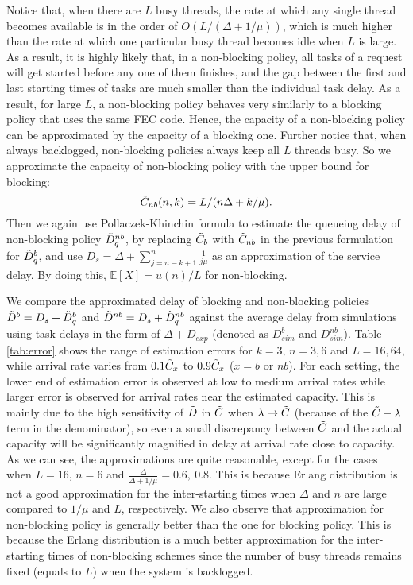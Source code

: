 \documentclass[journal]{IEEEtran}
\newcommand{\Expect}{\mathbb{E}}
\begin{document}
Notice that, when there are $L$ busy threads, the rate at which any single thread becomes available is in the order of $O(L/(\Delta + 1/\mu))$, which is much higher than the rate at which one particular busy thread becomes idle when $L$ is large. As a result, it is highly likely that, in a non-blocking policy, all tasks of a request will get started before any one of them finishes, and the gap between the first and last starting times of tasks are much smaller than the individual task delay. As a result, for large $L$,  a non-blocking policy behaves very similarly to a blocking policy that uses the same FEC code. Hence, the capacity of a non-blocking policy can be approximated by the capacity of a blocking one. Further notice that, when always backlogged, non-blocking policies always keep all $L$ threads busy. So we approximate the capacity of non-blocking policy with the upper bound for blocking:
\begin{equation}
\tilde{C}_{nb}(n,k) = L/(n\Delta + k/\mu).
\label{eq:nonblocking:cap}
\end{equation}
Then we again use Pollaczek-Khinchin formula to estimate the queueing delay of non-blocking policy $\tilde{D}_q^{nb}$, by replacing $\tilde{C}_b$ with $\tilde{C}_{nb}$ in the previous formulation for $\tilde{D}_q^b$, and use $D_s=\Delta +\sum_{j=n-k+1}^n \frac{1}{j\mu}$ as an approximation of the service delay. By doing this, $\Expect[X] = u(n)/L$ for non-blocking. 

We compare the approximated delay of blocking and non-blocking policies $\tilde{D}^b = D_s + \tilde{D}^b_q$ and $\tilde{D}^{nb} = D_s + \tilde{D}^{nb}_q$ against the average delay from simulations using  task delays in the form of $\Delta+D_{exp}$ (denoted as $D_{sim}^b$ and $D_{sim}^{nb}$). 
Table \ref{tab:error} shows the range of estimation errors for $k=3$, $n=3,6$ and $L=16,64$, while arrival rate varies from $0.1\tilde{C}_x$ to $0.9\tilde{C}_x$ ($x=b$ or $nb$). 
For each setting, the lower end of estimation error is observed at low to medium arrival rates while larger error is observed for arrival rates near the estimated capacity. This is mainly due to the high sensitivity of $\tilde{D}$ in  $\tilde{C}$ when $\lambda \rightarrow \tilde{C}$  (because of the  $\tilde{C} - \lambda$ term in the denominator), so even a small discrepancy between $\tilde{C}$ and the actual capacity will be significantly magnified in delay at arrival rate close to capacity. 
As we can see, the approximations are quite reasonable, except for the cases when $L=16$, $n=6$ and $\frac{\Delta}{\Delta + 1/\mu}=0.6,~0.8$. This is because Erlang distribution is not a good approximation for the inter-starting times when $\Delta$ and $n$ are large compared to $1/\mu$ and $L$, respectively.
We also observe that approximation for non-blocking policy is generally better than the one for blocking policy. 
This is because the Erlang distribution is a much better approximation for the inter-starting times of non-blocking schemes since the number of busy threads remains fixed (equals to $L$) when the system is backlogged.
\end{document}
